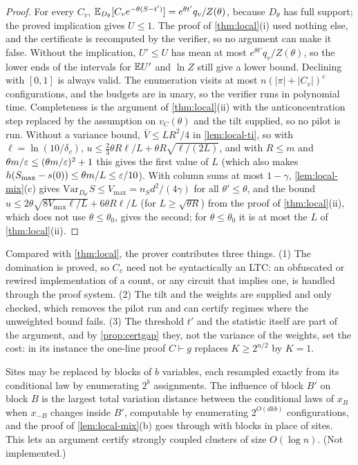 \begin{proof}
For every $C_v$, $\mathbb{E}_{D_\theta}[C_ve^{-\theta(S-t')}]=e^{\theta t'}q_v/Z(\theta)$, because $D_\theta$ has full
support; the proved implication gives $U\le1$. The proof of \cref{thm:local}(i) used nothing
else, and the certificate is recomputed by the verifier, so no argument can make it
false. Without the implication, $U'\le U$ has mean at most $e^{\theta t'}q_v/Z(\theta)$, so the lower
ends of the intervals for $\mathbb{E} U'$ and $\ln Z$ still give a lower bound. Declining with $[0,1]$
is always valid. The enumeration visits at most $n(|\pi|+|C_v|)^c$ configurations, and
the budgets are in unary, so the verifier runs in polynomial time. Completeness is the
argument of \cref{thm:local}(ii) with the anticoncentration step replaced by the assumption
on $v_C(\theta)$ and the tilt supplied, so no pilot is run. Without a variance bound,
$\bar V\le LR^2/4$ in \cref{lem:local-ti}, so with $\ell=\ln(10/\delta_v)$,
$u\le\frac23\theta R\ell/L+\theta R\sqrt{\ell/(2L)}$, and
with $R\le m$ and $\theta m/\varepsilon\le(\theta m/\varepsilon)^2+1$ this gives the first value of $L$ (which also
makes $h(S_{\max}-s(0))\le\theta m/L\le\varepsilon/10$). With column sums at most $1-\gamma$,
\cref{lem:local-mix}(c) gives $\mathrm{Var}_{D_{\theta'}}S\le V_{\max}=n_Sd^2/(4\gamma)$ for all
$\theta'\le\theta$, and the bound $u\le2\theta\sqrt{8V_{\max}\ell/L}+6\theta R\ell/L$ (for $L\ge\sqrt{\theta R}$)
from the proof of \cref{thm:local}(ii), which does not use $\theta\le\theta_0$, gives the second; for
$\theta\le\theta_0$ it is at most the $L$ of \cref{thm:local}(ii).
\end{proof}

Compared with \cref{thm:local}, the prover contributes three things. (1) The domination is
proved, so $C_v$ need not be syntactically an LTC: an obfuscated or rewired implementation
of a count, or any circuit that implies one, is handled through the proof system.
(2) The tilt and the weights are supplied and only checked, which removes the pilot run and
can certify regimes where the unweighted bound fails. (3) The threshold $t'$ and the
statistic itself are part of the argument, and by \cref{prop:certgap} they, not the
variance of the weights, set the cost: in its instance the one-line proof $C\vdash g$
replaces $K\ge2^{n/2}$ by $K=1$.

\begin{remark}
Sites may be replaced by blocks of $b$ variables, each resampled exactly from its
conditional law by enumerating $2^b$ assignments. The influence of block $B'$ on block $B$
is the largest total variation distance between the conditional laws of $x_B$ when
$x_{-B}$ changes inside $B'$, computable by enumerating $2^{O(dkb)}$ configurations, and the
proof of \cref{lem:local-mix}(b) goes through with blocks in place of sites. This lets an
argument certify strongly coupled clusters of size $O(\log n)$. (Not implemented.)
\end{remark}

